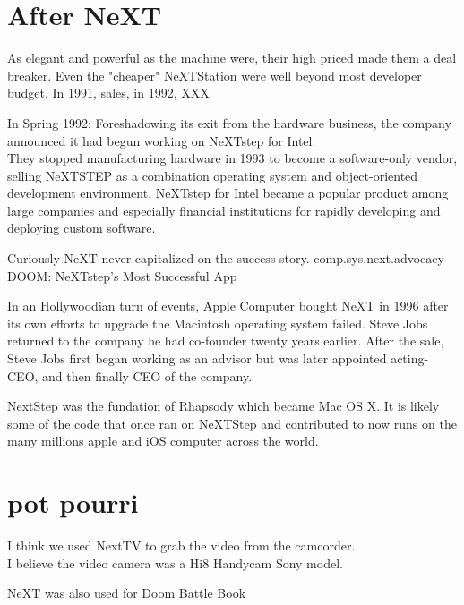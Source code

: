 \section{After NeXT}
As elegant and powerful as the machine were, their high priced made them a deal breaker. Even the "cheaper" NeXTStation were well beyond most developer budget. In 1991, sales, in 1992, XXX\\
\par
In Spring 1992: Foreshadowing its exit from the hardware business, the company announced it had begun working on NeXTstep for Intel.\\
They stopped manufacturing hardware in 1993 to become a software-only vendor, selling NeXTSTEP as a combination operating system and object-oriented development environment. NeXTstep for Intel became a popular product among large companies and especially financial institutions for rapidly developing and deploying custom software. \\
\par
Curiously NeXT never capitalized on the success story. comp.sys.next.advocacy DOOM: NeXTstep's Most Successful App\\
\par
In an Hollywoodian turn of events, Apple Computer bought NeXT in 1996 after its own efforts to upgrade the Macintosh operating system failed.  Steve Jobs returned to the company he had co-founder twenty years earlier. After the sale, Steve Jobs first began working as an advisor but was later appointed acting-CEO, and then finally CEO of the company.\\
\par
NextStep was the fundation of Rhapsody which became Mac OS X. It is likely some of the code that once ran on NeXTStep and contributed to \doom now runs on the many millions apple and iOS computer across the world.\\



\section{pot pourri}
\par
I think we used NextTV to grab the video from the camcorder.\\
I believe the video camera was a Hi8 Handycam Sony model.\\
\par
NeXT was also used for Doom Battle Book\\
